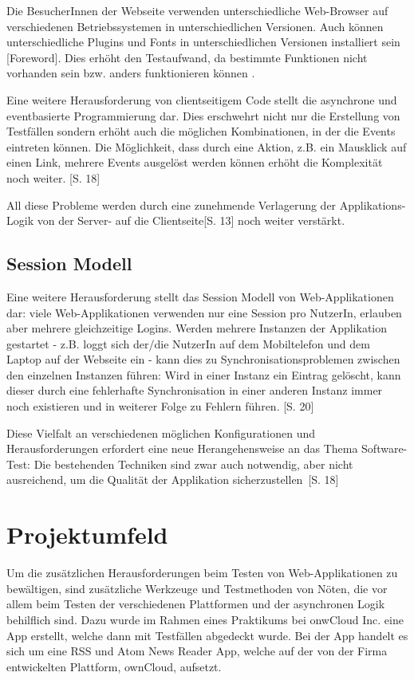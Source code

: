 \documentclass[a4paper,bibtotoc,oneside]{scrbook}
\begin{document}
Die BesucherInnen der Webseite verwenden unterschiedliche Web-Browser auf verschiedenen Betriebssystemen in unterschiedlichen Versionen. Auch können unterschiedliche Plugins und Fonts in unterschiedlichen Versionen installiert sein \cite{testing_apps_on_web}[Foreword]. Dies erhöht den Testaufwand, da bestimmte Funktionen nicht vorhanden sein bzw. anders funktionieren können \cite{caniuse}.

Eine weitere Herausforderung von clientseitigem Code stellt die asynchrone und eventbasierte Programmierung dar. Dies erschwehrt nicht nur die Erstellung von Testfällen sondern erhöht auch die möglichen Kombinationen, in der die Events eintreten können. Die Möglichkeit, dass durch eine Aktion, z.B. ein Mausklick auf einen Link, mehrere Events ausgelöst werden können erhöht die Komplexität noch weiter. \cite{testing_apps_on_web}[S. 18]

All diese Probleme werden durch eine zunehmende Verlagerung der Applikations-Logik von der Server- auf die Clientseite\cite{testing_apps_on_web}[S. 13] noch weiter verstärkt.

\section{Session Modell}
Eine weitere Herausforderung stellt das Session Modell von Web-Applikationen dar: viele Web-Applikationen verwenden nur eine Session pro NutzerIn, erlauben aber mehrere gleichzeitige Logins. Werden mehrere Instanzen der Applikation gestartet - z.B. loggt sich der/die NutzerIn auf dem Mobiltelefon und dem Laptop auf der Webseite ein - kann dies zu Synchronisationsproblemen zwischen den einzelnen Instanzen führen: Wird in einer Instanz ein Eintrag gelöscht, kann dieser durch eine fehlerhafte Synchronisation in einer anderen Instanz immer noch existieren und in weiterer Folge zu Fehlern führen. \cite{testing_apps_on_web}[S. 20]


Diese Vielfalt an verschiedenen möglichen Konfigurationen und Herausforderungen erfordert eine neue Herangehensweise an das Thema Software-Test: Die bestehenden Techniken sind \glqq zwar auch notwendig, aber nicht ausreichend, um die Qualität der Applikation sicherzustellen\grqq\ \cite{eval_automat_webapp_test}[S. 18]


\chapter{Projektumfeld}
Um die zusätzlichen Herausforderungen beim Testen von Web-Applikationen zu bewältigen, sind zusätzliche Werkzeuge und Testmethoden von Nöten, die vor allem beim Testen der verschiedenen Plattformen und der asynchronen Logik behilflich sind. Dazu wurde im Rahmen eines Praktikums bei onwCloud Inc. eine App erstellt, welche dann mit Testfällen abgedeckt wurde. Bei der App handelt es sich um eine RSS und Atom News Reader App, welche auf der von der Firma entwickelten Plattform, ownCloud\cite{owncloud}, aufsetzt.
\end{document}
